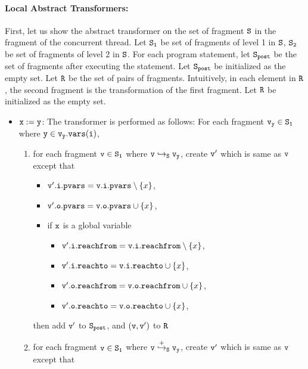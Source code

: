 \paragraph{Local Abstract Transformers:} First, let us show the abstract transformer on the set of fragment $\tt S$ in the fragment of the concurrent thread. Let $\tt S_1$ be set of fragments of level 1 in $\tt S$, $\tt S_2$ be set of fragments of level 2 in $\tt S$. For each program statement, let $\tt S_{post}$ be the set of fragments after executing the statement. Let $\tt S_{post}$ be initialized as the empty set.  Let $\tt R$ be the set of pairs of fragments. Intuitively, in each element in $\tt R$, the second fragment is the transformation of the first fragment. Let $\tt R$ be initialized as the empty set.
\begin{itemize}
\item ${\tt x := y}$: The transformer is performed as follows:  For each fragment $\tt v_y \in S_1$ where $\tt y \in v_y.{\tt vars}(\tt i)$, 
\begin{enumerate}
\item  for each fragment $\tt v \in S_1$ where $\tt v \hookrightarrow_S v_y$, create $\tt v'$ which is same as $\tt v$ except that
\begin{itemize}
\item $\mathtt{v}'.\mathtt{i}.\mathtt{pvars} = \mathtt{v}.\mathtt{i}.\mathtt{pvars} \setminus \left\{x\right\}$,
\item $\mathtt{v}'.\mathtt{o}.\mathtt{pvars} = \mathtt{v}.\mathtt{o}.\mathtt{pvars} \cup \left\{x\right\}$,
\item if $\tt x$ is a global variable
\begin{itemize}
\item $\mathtt{v}'.\mathtt{i}.\mathtt{reachfrom} = \mathtt{v}.\mathtt{i}.\mathtt{reachfrom} \setminus \left\{x\right\}$,
\item $\mathtt{v}'.\mathtt{i}.\mathtt{reachto} = \mathtt{v}.\mathtt{i}.\mathtt{reachto} \cup \left\{x\right\}$,
 \item $\mathtt{v}'.\mathtt{o}.\mathtt{reachfrom} = \mathtt{v}.\mathtt{o}.\mathtt{reachfrom} \cup \left\{x\right\}$,
\item $\mathtt{v}'.\mathtt{o}.\mathtt{reachto} = \mathtt{v}.\mathtt{o}.\mathtt{reachto} \cup \left\{x\right\}$,
\end{itemize}
\end{itemize}
then add $\tt v'$ to $\tt S_{post}$, and $\tt (v,v')$ to $\tt R$
\item for each fragment $\tt v \in S_1$ where $\tt v \overset{+}\hookrightarrow_S v_y$, create $\tt v'$ which is same as $\tt v$ except that
\begin{itemize}

\end{itemize}
\end{enumerate}
\end{itemize}
